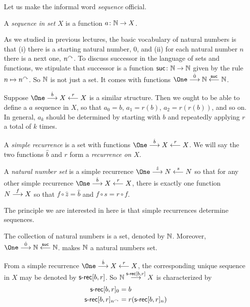 Let us make the informal word \emph{sequence} official.

\begin{defn}
	A \emph{sequence in set $X$} is a function $\fromto a\NN X$.
\end{defn}

As we studied in previous lectures, the basic vocabulary of natural numbers is that (i) there is a starting natural number, $0$, and (ii) for each natural number $n$ there is a next one, $n^\nxt$. 
To discuss successor in the language of sets and functions, we stipulate that successor is a function $\fromto \suc\NN\NN$ given by the rule $n\mapsto n^\nxt$.
So $\NN$ is not just a set. 
It comes with functions $\One \stackrel{\hat{0}}{\longrightarrow} \NN \stackrel{\suc}{\longleftarrow} \NN$.

Suppose $\One\stackrel{\hat{b}}{\longrightarrow}X\stackrel{r}{\longleftarrow}X$ is a similar structure.
Then we ought to be able to define a $a$ sequence in $X$, so that $a_0=b$, $a_1=r(b)$, $a_2=r(r(b))$, and so on. 
In general, $a_k$ should be determined by starting with $b$ and repeatedly applying $r$ a total of $k$ times. 

\begin{defn}\label{def:nno}
	A \emph{simple recurrence} is a set with functions $\One\stackrel{\hat{b}}{\longrightarrow}X\stackrel{r}{\longleftarrow}X$. We will say the two functions $\hat{b}$ and $r$ form a \emph{recurrence on $X$}.
	
	A \emph{natural number set} is a simple recurrence   $\One\stackrel{\hat{z}}{\longrightarrow}N\stackrel{s}{\longleftarrow}N$ so that for any other simple recurrence $\One\stackrel{\hat{b}}{\longrightarrow}X\stackrel{r}{\longleftarrow}X$, there is exactly one function $\sfromto fNX$ so that $f\circ \hat{z} =\hat b$ and $f\circ s = r\circ f$.
\end{defn}

The principle we are interested in here is that simple recurrences determine sequences.

\begin{principle}\label{ax:nat-numbers}
	The collection of natural numbers is a set, denoted by $\NN$.
	Moreover, $\One \stackrel{\hat{0}}{\longrightarrow} \NN \stackrel{\suc}{\longleftarrow} \NN$.
	makes $\NN$ a natural numbers set.
	
	From a simple recurrence $\One \stackrel{\hat{b}}{\longrightarrow} X \stackrel{r}{\longleftarrow} X$, the corresponding unique sequence in $X$
	may be denoted by $\srec[b,r]$. So $\sfromto {\srec[b,r]}\NN X$ is characterized by
	\begin{align*}
		\srec[b,r]_0 &= b\\
		\srec[b,r]_{n^\nxt} &= r(\srec[b,r]_n)
	\end{align*}
\end{principle}

